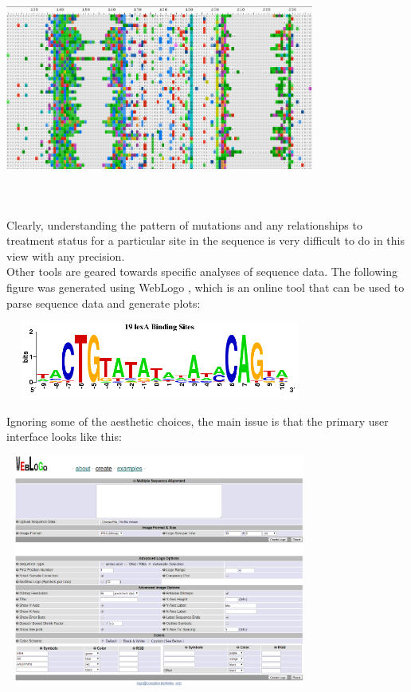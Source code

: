 \documentclass{article}
\begin{document}
\begin{center}
\includegraphics[height=3in,width=4in]{aliview.png}
\end{center}
Clearly, understanding the pattern of mutations and any relationships to treatment status for a particular site in the sequence is very difficult to do in this view with any precision.
\\
\newline
\noindent Other tools are geared towards specific analyses of sequence data.  The following figure was generated using WebLogo \cite{weblogo}, which is an online tool that can be used to parse sequence data and generate plots:
\begin{center}
\includegraphics[height=1in,width=4in]{lexA.png}
\end{center}
Ignoring some of the aesthetic choices, the main issue is that the primary user interface looks like this:
\begin{center}
\includegraphics[height=3in,width=4in]{webloginterface.png}
\end{center}
\end{document}
